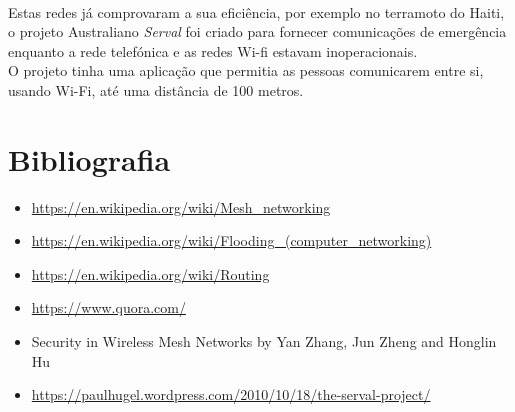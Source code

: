 \documentclass[letterpaper, 11pt]{article}
\begin{document}
\paragraph{}
Estas redes já comprovaram a sua eficiência, por exemplo no terramoto do Haiti, o projeto Australiano \emph{Serval} foi criado para fornecer comunicações de emergência
enquanto a rede telefónica e as redes Wi-fi estavam inoperacionais.\\
O projeto tinha uma aplicação que permitia as pessoas comunicarem entre si, usando Wi-Fi, até uma distância de 100 metros.

\clearpage

\section{Bibliografia}
\label{sec:org3aab605}

\begin{itemize}
\item \url{https://en.wikipedia.org/wiki/Mesh\_networking}
\item \url{https://en.wikipedia.org/wiki/Flooding\_(computer\_networking)}
\item \url{https://en.wikipedia.org/wiki/Routing}
\item \url{https://www.quora.com/}
\item Security in Wireless Mesh Networks by Yan Zhang, Jun Zheng and Honglin Hu
\item \url{https://paulhugel.wordpress.com/2010/10/18/the-serval-project/}
\end{itemize}
\end{document}
